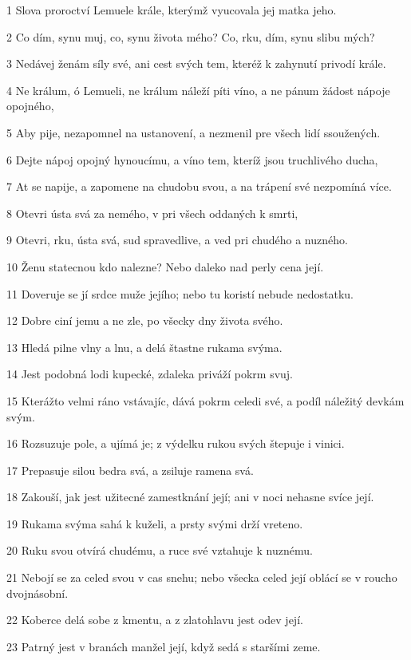 \par 1 Slova proroctví Lemuele krále, kterýmž vyucovala jej matka jeho.
\par 2 Co dím, synu muj, co, synu života mého? Co, rku, dím, synu slibu mých?
\par 3 Nedávej ženám síly své, ani cest svých tem, kteréž k zahynutí privodí krále.
\par 4 Ne králum, ó Lemueli, ne králum náleží píti víno, a ne pánum žádost nápoje opojného,
\par 5 Aby pije, nezapomnel na ustanovení, a nezmenil pre všech lidí ssoužených.
\par 6 Dejte nápoj opojný hynoucímu, a víno tem, kteríž jsou truchlivého ducha,
\par 7 At se napije, a zapomene na chudobu svou, a na trápení své nezpomíná více.
\par 8 Otevri ústa svá za nemého, v pri všech oddaných k smrti,
\par 9 Otevri, rku, ústa svá, sud spravedlive, a ved pri chudého a nuzného.
\par 10 Ženu statecnou kdo nalezne? Nebo daleko nad perly cena její.
\par 11 Doveruje se jí srdce muže jejího; nebo tu koristí nebude nedostatku.
\par 12 Dobre ciní jemu a ne zle, po všecky dny života svého.
\par 13 Hledá pilne vlny a lnu, a delá štastne rukama svýma.
\par 14 Jest podobná lodi kupecké, zdaleka priváží pokrm svuj.
\par 15 Kterážto velmi ráno vstávajíc, dává pokrm celedi své, a podíl náležitý devkám svým.
\par 16 Rozsuzuje pole, a ujímá je; z výdelku rukou svých štepuje i vinici.
\par 17 Prepasuje silou bedra svá, a zsiluje ramena svá.
\par 18 Zakouší, jak jest užitecné zamestknání její; ani v noci nehasne svíce její.
\par 19 Rukama svýma sahá k kuželi, a prsty svými drží vreteno.
\par 20 Ruku svou otvírá chudému, a ruce své vztahuje k nuznému.
\par 21 Nebojí se za celed svou v cas snehu; nebo všecka celed její oblácí se v roucho dvojnásobní.
\par 22 Koberce delá sobe z kmentu, a z zlatohlavu jest odev její.
\par 23 Patrný jest v branách manžel její, když sedá s staršími zeme.
